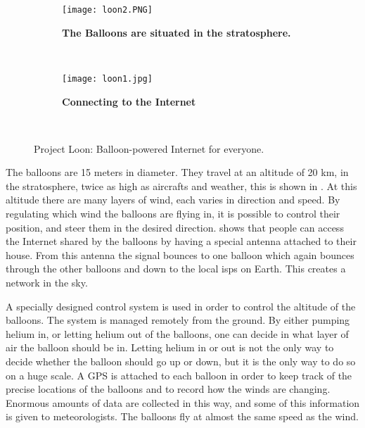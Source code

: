 \begin{figure}
        \centering
        \begin{subfigure}[t]{0.43\textwidth}
                \texttt{[image: loon2.PNG]}
                \caption[The Balloons are situated in the stratosphere]{\textbf{The Balloons are situated in the stratosphere.}} 
                \label{fig:loonStratosphere}
        \end{subfigure}%
        ~ %
        \begin{subfigure}[t]{0.415\textwidth}
                \texttt{[image: loon1.jpg]}
               \caption[Connecting to the Internet]							{\textbf{Connecting to the Internet}} 
                \label{fig:loonConnect}
        \end{subfigure}
        ~ %
        \caption{Project Loon: Balloon-powered Internet for everyone.}\label{fig:loon}
\end{figure}



The balloons are 15 meters in diameter. They travel at an altitude of 20 km, in the stratosphere, twice as high as aircrafts and weather, this is shown in . At this altitude there are many layers of wind, each varies in direction and speed. By regulating which wind the balloons are flying in, it is possible to control their position, and steer them in the desired direction.  shows that people can access the Internet shared by the balloons by having a special antenna attached to their house. From this antenna the signal bounces to one balloon which again bounces through the other balloons and down to the local \glspl{isp} on Earth. This creates a network in the sky. 

A specially designed control system is used in order to control the altitude of the balloons. The system is managed remotely from the ground. By either pumping helium in, or letting helium out of the balloons, one can decide in what layer of air the balloon should be in. Letting helium in or out is not the only way to decide whether the balloon should go up or down, but it is the only way to do so on a huge scale. A GPS is attached to each balloon in order to keep track of the precise locations of the balloons and to record how the winds are changing. Enormous amounts of data are collected in this way, and some of this information is given to meteorologists. The balloons fly at almost the same speed as the wind.  

